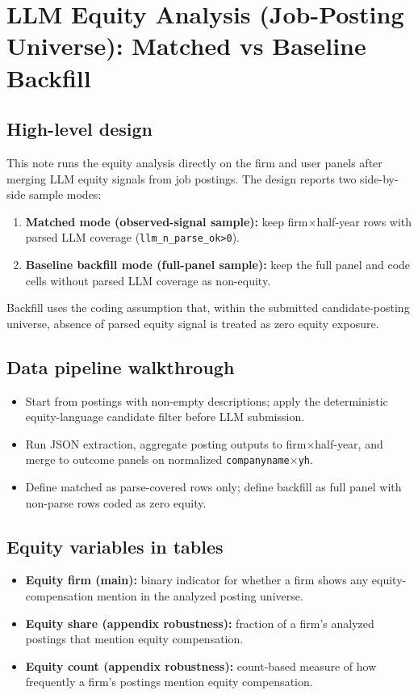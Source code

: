 \documentclass{article}
\begin{document}
\section*{LLM Equity Analysis (Job-Posting Universe): Matched vs Baseline Backfill}

\subsection*{High-level design}
This note runs the equity analysis directly on the firm and user panels after merging LLM equity signals from job postings. The design reports two side-by-side sample modes:
\begin{enumerate}
  \item \textbf{Matched mode (observed-signal sample):} keep firm$\times$half-year rows with parsed LLM coverage (\texttt{llm\_n\_parse\_ok>0}).
  \item \textbf{Baseline backfill mode (full-panel sample):} keep the full panel and code cells without parsed LLM coverage as non-equity.
\end{enumerate}
Backfill uses the coding assumption that, within the submitted candidate-posting universe, absence of parsed equity signal is treated as zero equity exposure.

\subsection*{Data pipeline walkthrough}
\begin{itemize}
  \item Start from postings with non-empty descriptions; apply the deterministic equity-language candidate filter before LLM submission.
  \item Run JSON extraction, aggregate posting outputs to firm$\times$half-year, and merge to outcome panels on normalized \texttt{companyname}$\times$\texttt{yh}.
  \item Define matched as parse-covered rows only; define backfill as full panel with non-parse rows coded as zero equity.
\end{itemize}

\subsection*{Equity variables in tables}
\begin{itemize}
  \item \textbf{Equity firm (main):} binary indicator for whether a firm shows any equity-compensation mention in the analyzed posting universe.
  \item \textbf{Equity share (appendix robustness):} fraction of a firm’s analyzed postings that mention equity compensation.
  \item \textbf{Equity count (appendix robustness):} count-based measure of how frequently a firm’s postings mention equity compensation.
\end{itemize}
\end{document}
